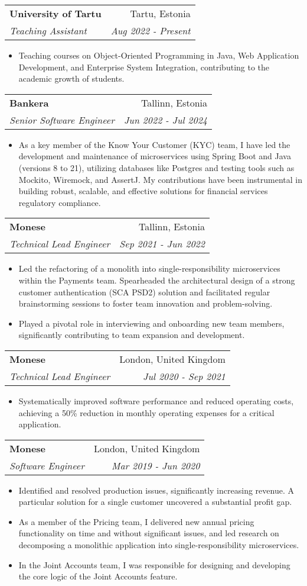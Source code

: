 \documentclass[11pt,a4paper,oneside]{report}
\makeatletter
\newcommand{\resumeItemWithoutTitle}[2]{
    \item\small{
        \textbf{#1}{#2\vspace{-2pt}}
    }
}
\newcommand{\resumeSubheading}[4]{
    \vspace{-1pt}\item
    \begin{tabular*}{0.97\textwidth}[t]{l@{\extracolsep{\fill}}r}
        \textbf{#1} & #2 \\
        \textit{\small#3} & \textit{\small #4} \\
    \end{tabular*}\vspace{-5pt}
}
\newcommand{\resumeItemListStart}{\begin{itemize}}
\newcommand{\resumeItemListEnd}{\end{itemize}\vspace{-5pt}}
\makeatother
\begin{document}
  \resumeSubheading
  {University of Tartu}{Tartu, Estonia}
  {Teaching Assistant}{Aug 2022 - Present}
      \resumeItemListStart
          \resumeItemWithoutTitle{}
          {Teaching courses on Object-Oriented Programming in Java, Web Application Development, and Enterprise System Integration, contributing to the academic growth of students.}
      \resumeItemListEnd

  \resumeSubheading
  {Bankera}{Tallinn, Estonia}
  {Senior Software Engineer}{Jun 2022 - Jul 2024}
      \resumeItemListStart
          \resumeItemWithoutTitle{}
          {As a key member of the Know Your Customer (KYC) team, I have led the development and maintenance of microservices using Spring Boot and Java (versions 8 to 21), utilizing databases like Postgres and testing tools such as Mockito, Wiremock, and AssertJ. My contributions have been instrumental in building robust, scalable, and effective solutions for financial services regulatory compliance.}
      \resumeItemListEnd

  \resumeSubheading
  {Monese}{Tallinn, Estonia}
  {Technical Lead Engineer}{Sep 2021 - Jun 2022}
    \resumeItemListStart
      \resumeItemWithoutTitle{}
      {Led the refactoring of a monolith into single-responsibility microservices within the Payments team. Spearheaded the architectural design of a strong customer authentication (SCA PSD2) solution and facilitated regular brainstorming sessions to foster team innovation and problem-solving.}
      \resumeItemWithoutTitle{}
      {Played a pivotal role in interviewing and onboarding new team members, significantly contributing to team expansion and development.}
    \resumeItemListEnd

  \resumeSubheading
  {Monese}{London, United Kingdom}
  {Technical Lead Engineer}{Jul 2020 - Sep 2021}
      \resumeItemListStart
          \resumeItemWithoutTitle{}
          {Systematically improved software performance and reduced operating costs, achieving a 50\% reduction in monthly operating expenses for a critical application.}
      \resumeItemListEnd

  \resumeSubheading
  {Monese}{London, United Kingdom}
  {Software Engineer}{Mar 2019 - Jun 2020}
      \resumeItemListStart
          \resumeItemWithoutTitle{}
          {Identified and resolved production issues, significantly increasing revenue. A particular solution for a single customer uncovered a substantial profit gap.}
          \resumeItemWithoutTitle{}
          {As a member of the Pricing team, I delivered new annual pricing functionality on time and without significant issues, and led research on decomposing a monolithic application into single-responsibility microservices.}
          \resumeItemWithoutTitle{}
          {In the Joint Accounts team, I was responsible for designing and developing the core logic of the Joint Accounts feature.}
      \resumeItemListEnd
\end{document}
